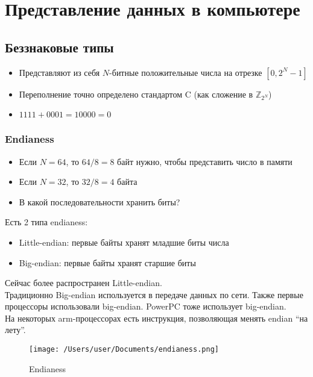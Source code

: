 \section{Представление данных в компьютере}
  \subsection{Беззнаковые типы}
  \begin{itemize}
    \item Представляют из себя $N$-битные положительные числа на отрезке $[0, 2^N - 1]$
    \item Переполнение точно определено стандартом C (как сложение в $\mathbb{Z}_{2^N}$)
    \item $1111+0001=10000=0$
  \end{itemize}
    
  \subsubsection{Endianess}
    \begin{itemize}
      \item Если $N = 64$, то $64 / 8 = 8$ байт нужно, чтобы представить число в памяти
      \item Если $N = 32$, то $32 / 8 = 4$ байта
      \item В какой последовательности хранить биты?
    \end{itemize}
    
    Есть 2 типа endianess:
    \begin{itemize}
      \item Little-endian: первые байты хранят младшие биты числа
      \item Big-endian: первые байты хранят старшие биты
    \end{itemize}
    Сейчас более распространен Little-endian.\\    Традиционно Big-endian используется в передаче данных по сети. Также первые процессоры использовали big-endian. PowerPC тоже использует big-endian.\\
    На некоторых arm-процессорах есть инструкция, позволяющая менять endian ``на лету''. 
    
\begin{figure}[h!]
  \texttt{[image: /Users/user/Documents/endianess.png]}
  \caption{Endianess}
  \label{fig:endianess}
\end{figure}

    
